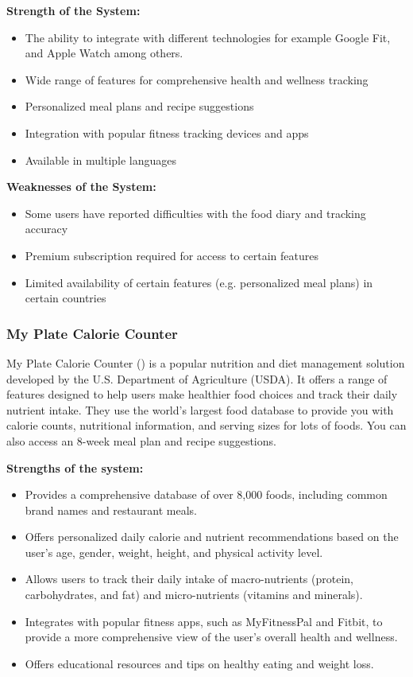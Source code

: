 \documentclass{article}
\begin{document}
\textbf{Strength of the System:}
\begin{itemize}
\item The ability to integrate with different technologies for example Google Fit, and Apple Watch among others.
\item Wide range of features for comprehensive health and wellness tracking
\item Personalized meal plans and recipe suggestions
\item Integration with popular fitness tracking devices and apps
\item Available in multiple languages
\end{itemize}

\textbf{Weaknesses of the System:}
\begin{itemize}
\item Some users have reported difficulties with the food diary and tracking accuracy
\item Premium subscription required for access to certain features
\item Limited availability of certain features (e.g. personalized meal plans) in certain countries
\end{itemize}

\subsubsection{My Plate Calorie Counter}

My Plate Calorie Counter (\cite{myplate}) is a popular nutrition and diet management solution developed by the U.S. Department of Agriculture (USDA). It offers a range of features designed to help users make healthier food choices and track their daily nutrient intake. They use the world’s largest food database to provide you with calorie counts, nutritional information, and serving sizes for lots of foods. You can also access an 8-week meal plan and recipe suggestions.

\textbf{Strengths of the system:}
\begin{itemize}

\item Provides a comprehensive database of over 8,000 foods, including common brand names and restaurant meals.
\item Offers personalized daily calorie and nutrient recommendations based on the user's age, gender, weight, height, and physical activity level.
\item Allows users to track their daily intake of macro-nutrients (protein, carbohydrates, and fat) and micro-nutrients (vitamins and minerals).
\item Integrates with popular fitness apps, such as MyFitnessPal and Fitbit, to provide a more comprehensive view of the user's overall health and wellness.
\item Offers educational resources and tips on healthy eating and weight loss.

\end{itemize}
\end{document}
